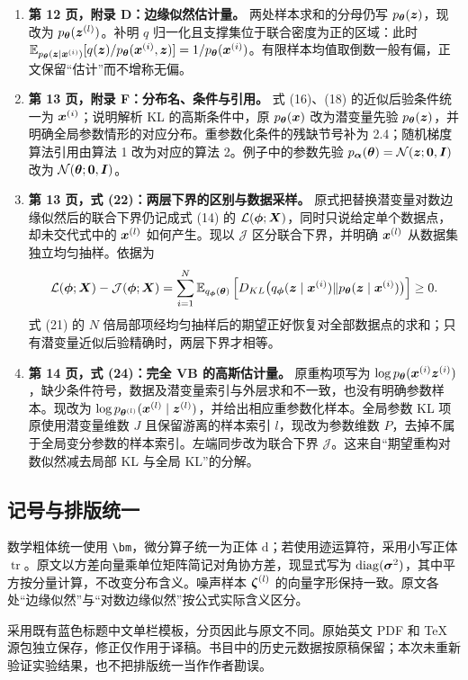 \begin{enumerate}
\item \textbf{第 12 页，附录 D：边缘似然估计量。}
两处样本求和的分母仍写 $p_{\bm{\theta}}(\bm{z})$，现改为 $p_{\bm{\theta}}(\bm{z}^{(l)})$。补明 $q$ 归一化且支撑集位于联合密度为正的区域：此时 $\mathbb{E}_{p_{\bm{\theta}}(\bm{z}\mid\bm{x}^{(i)})}[q(\bm{z})/p_{\bm{\theta}}(\bm{x}^{(i)},\bm{z})]=1/p_{\bm{\theta}}(\bm{x}^{(i)})$。有限样本均值取倒数一般有偏，正文保留“估计”而不增称无偏。

\item \textbf{第 13 页，附录 F：分布名、条件与引用。}
式 (16)、(18) 的近似后验条件统一为 $\bm{x}^{(i)}$；说明解析 KL 的高斯条件中，原 $p_{\bm{\theta}}(\bm{x})$ 改为潜变量先验 $p_{\bm{\theta}}(\bm{z})$，并明确全局参数情形的对应分布。重参数化条件的残缺节号补为 2.4；随机梯度算法引用由算法 1 改为对应的算法 2。例子中的参数先验 $p_{\bm{\alpha}}(\bm{\theta})=\mathcal{N}(\bm{z};\bm{0},\bm{I})$ 改为 $\mathcal{N}(\bm{\theta};\bm{0},\bm{I})$。

\item \textbf{第 13 页，式 (22)：两层下界的区别与数据采样。}
原式把替换潜变量对数边缘似然后的联合下界仍记成式 (14) 的 $\mathcal{L}(\bm{\phi};\bm{X})$，同时只说给定单个数据点，却未交代式中的 $\bm{x}^{(l)}$ 如何产生。现以 $\mathcal{J}$ 区分联合下界，并明确 $\bm{x}^{(l)}$ 从数据集独立均匀抽样。依据为
\[
\mathcal{L}(\bm{\phi};\bm{X})-\mathcal{J}(\bm{\phi};\bm{X})
=\sum_{i=1}^N\mathbb{E}_{q_{\bm{\phi}}(\bm{\theta})}
\left[D_{KL}\bigl(q_{\bm{\phi}}(\bm{z}\mid\bm{x}^{(i)})\Vert p_{\bm{\theta}}(\bm{z}\mid\bm{x}^{(i)})\bigr)\right]\geq0.
\]
式 (21) 的 $N$ 倍局部项经均匀抽样后的期望正好恢复对全部数据点的求和；只有潜变量近似后验精确时，两层下界才相等。

\item \textbf{第 14 页，式 (24)：完全 VB 的高斯估计量。}
原重构项写为 $\log p_{\bm{\theta}}(\bm{x}^{(i)}\bm{z}^{(i)})$，缺少条件符号，数据及潜变量索引与外层求和不一致，也没有明确参数样本。现改为 $\log p_{\bm{\theta}^{(l)}}(\bm{x}^{(l)}\mid\bm{z}^{(l)})$，并给出相应重参数化样本。全局参数 KL 项原使用潜变量维数 $J$ 且保留游离的样本索引 $l$，现改为参数维数 $P$，去掉不属于全局变分参数的样本索引。左端同步改为联合下界 $\mathcal{J}$。这来自“期望重构对数似然减去局部 KL 与全局 KL”的分解。
\end{enumerate}

\subsection*{记号与排版统一}
数学粗体统一使用 \texttt{\textbackslash bm}，微分算子统一为正体 $\mathrm{d}$；若使用迹运算符，采用小写正体 $\operatorname{tr}$。原文以方差向量乘单位矩阵简记对角协方差，现显式写为 $\operatorname{diag}(\bm{\sigma}^2)$，其中平方按分量计算，不改变分布含义。噪声样本 $\bm{\zeta}^{(l)}$ 的向量字形保持一致。原文各处“边缘似然”与“对数边缘似然”按公式实际含义区分。

采用既有蓝色标题中文单栏模板，分页因此与原文不同。原始英文 PDF 和 TeX 源包独立保存，修正仅作用于译稿。书目中的历史元数据按原稿保留；本次未重新验证实验结果，也不把排版统一当作作者勘误。
